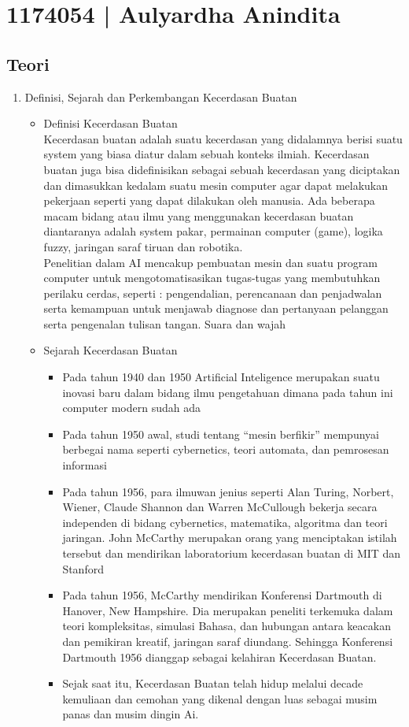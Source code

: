 \section{1174054 | Aulyardha Anindita}

\subsection{Teori}
\begin{enumerate}
\item Definisi, Sejarah dan Perkembangan Kecerdasan Buatan
\begin{itemize}
\item Definisi Kecerdasan Buatan\\
Kecerdasan buatan adalah suatu kecerdasan yang didalamnya berisi suatu system yang biasa diatur dalam sebuah konteks ilmiah. Kecerdasan  buatan juga bisa didefinisikan sebagai sebuah kecerdasan yang diciptakan dan dimasukkan kedalam suatu mesin computer agar dapat melakukan pekerjaan seperti yang dapat dilakukan oleh manusia. Ada beberapa macam bidang atau ilmu yang menggunakan kecerdasan buatan diantaranya adalah system pakar, permainan computer (game), logika fuzzy, jaringan saraf tiruan dan robotika.\\
Penelitian dalam AI mencakup pembuatan mesin dan suatu program computer untuk mengotomatisasikan tugas-tugas yang membutuhkan perilaku cerdas, seperti : pengendalian, perencanaan dan penjadwalan serta kemampuan untuk menjawab diagnose dan pertanyaan pelanggan serta pengenalan tulisan tangan. Suara dan wajah

\item Sejarah Kecerdasan Buatan
\begin{itemize}
\item Pada tahun 1940 dan 1950 Artificial Inteligence merupakan suatu inovasi baru dalam bidang ilmu pengetahuan dimana pada tahun ini computer modern sudah ada
\item Pada tahun 1950 awal, studi tentang “mesin berfikir” mempunyai berbegai nama seperti cybernetics, teori automata, dan pemrosesan informasi
\item Pada tahun 1956, para ilmuwan jenius seperti Alan Turing, Norbert, Wiener, Claude Shannon dan Warren McCullough bekerja secara independen di bidang cybernetics, matematika, algoritma dan teori jaringan. John McCarthy merupakan orang yang menciptakan istilah tersebut dan mendirikan laboratorium kecerdasan buatan di MIT dan Stanford
\item Pada tahun 1956, McCarthy mendirikan Konferensi Dartmouth di Hanover, New Hampshire. Dia merupakan peneliti terkemuka dalam teori kompleksitas, simulasi Bahasa, dan hubungan antara keacakan dan pemikiran kreatif, jaringan saraf diundang. Sehingga Konferensi Dartmouth 1956 dianggap sebagai kelahiran Kecerdasan Buatan.
\item Sejak saat itu, Kecerdasan Buatan telah hidup melalui decade kemuliaan dan cemohan yang dikenal dengan luas sebagai musim panas dan musim dingin Ai.
\end{itemize}


\end{itemize}
\end{enumerate}
